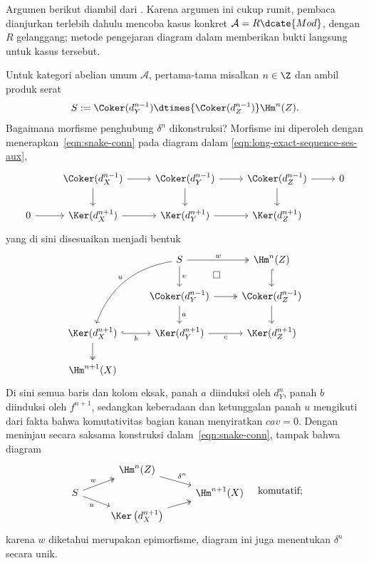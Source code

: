 \begin{bukti}
	Argumen berikut diambil dari \cite[Proposisi~12.3.6]{KS06}. Karena
	argumen ini cukup rumit, pembaca dianjurkan terlebih dahulu mencoba kasus
	konkret $\mathcal{A}=R\dcate{Mod}$, dengan $R$ gelanggang; metode pengejaran
	diagram dalam \cite[\S 6.8]{Li1} memberikan bukti langsung untuk kasus
	tersebut.

	Untuk kategori abelian umum $\mathcal{A}$, pertama-tama misalkan
	$n\in\Z$ dan ambil produk serat
	\[ S := \Coker(d_Y^{n-1}) \dtimes{\Coker(d_Z^{n-1})} \Hm^n(Z). \]
	Bagaimana morfisme penghubung $\delta^n$ dikonstruksi? Morfisme ini
	diperoleh dengan menerapkan~\eqref{eqn:snake-conn} pada diagram dalam
	\eqref{eqn:long-exact-sequence-ses-aux},
	\[\begin{tikzcd}
		& \Coker(d_X^{n-1}) \arrow[r] \arrow[d] & \Coker(d_Y^{n-1}) \arrow[r] \arrow[d] & \Coker(d_Z^{n-1}) \arrow[d] \arrow[r] & 0 \\
		0 \arrow[r] & \Ker(d_X^{n+1}) \arrow[r] & \Ker(d_Y^{n+1}) \arrow[r] & \Ker(d_Z^{n+1}) &
	\end{tikzcd}\]
	yang di sini disesuaikan menjadi bentuk
	\begin{equation}\label{eqn:connecting-eta-delta-0}\begin{tikzcd}
		& S \arrow[twoheadrightarrow, r, "w"] \arrow[d, "v"] \arrow[ldd, bend right, "u"'] \arrow[rd, phantom, "\Box" description] & \Hm^n(Z) \arrow[hookrightarrow, d] \\
		& \Coker(d_Y^{n-1}) \arrow[twoheadrightarrow, r] \arrow[d, "a"] & \Coker(d_Z^{n-1}) \arrow[d] \\
		\Ker(d_X^{n+1}) \arrow[hookrightarrow, r, "b"'] \arrow[twoheadrightarrow, d] & \Ker(d_Y^{n+1}) \arrow[r, "c"'] & \Ker(d_Z^{n+1}) \\
		\Hm^{n+1}(X) & &
	\end{tikzcd}\end{equation}
	Di sini semua baris dan kolom eksak, panah $a$ diinduksi oleh $d_Y^n$,
	panah $b$ diinduksi oleh $f^{n+1}$, sedangkan keberadaan dan ketunggalan
	panah $u$ mengikuti dari fakta bahwa komutativitas bagian kanan menyiratkan
	$cav=0$. Dengan meninjau secara saksama konstruksi
	dalam~\eqref{eqn:snake-conn}, tampak bahwa diagram
	\begin{equation}\label{eqn:connecting-eta-delta-0.5}\begin{tikzcd}[row sep=tiny]
		& \Hm^n(Z) \arrow[rd, "\delta^n"] & \\
		S \arrow[twoheadrightarrow, ru, "w"] \arrow[rd, "u"'] & & \Hm^{n+1}(X) \\
		& \Ker\left( d_X^{n+1} \right) \arrow[twoheadrightarrow, ru] &
	\end{tikzcd} \quad \text{komutatif}; \end{equation}
	karena $w$ diketahui merupakan epimorfisme, diagram ini juga menentukan
	$\delta^n$ secara unik.


\end{bukti}
